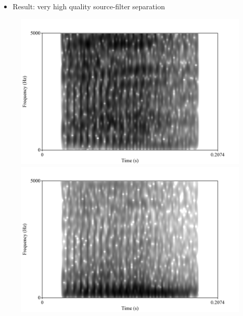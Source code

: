 \documentclass{beamer}
\begin{document}
\begin{frame}
\begin{itemize}
\item{Result: very high quality source-filter separation}
\end{itemize}
\begin{figure}
\includegraphics[scale=0.3,keepaspectratio]{not_very_white.png}
\includegraphics[scale=0.3,keepaspectratio]{much_more_white.png}
\end{figure}
\end{frame}
\end{document}
